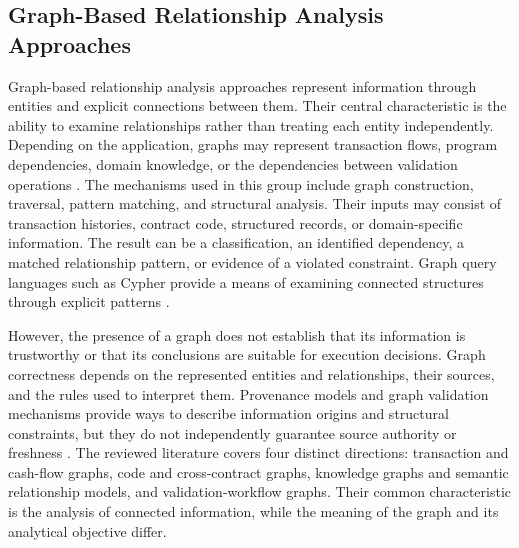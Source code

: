 



\subsection{Graph-Based Relationship Analysis Approaches}
\label{subsec:graph_structured_approaches}

Graph-based relationship analysis approaches represent
information through entities and explicit connections
between them. Their central characteristic is the
ability to examine relationships rather than treating
each entity independently. Depending on the application,
graphs may represent transaction flows, program
dependencies, domain knowledge, or the dependencies
between validation operations
\cite{hoganKnowledgeGraphs2021,
anglesPropertyGraphModel2018}. The mechanisms used in this group include graph construction,
traversal, pattern matching, and structural analysis. Their
inputs may consist of transaction histories, contract code,
structured records, or domain-specific information. The
result can be a classification, an identified dependency,
a matched relationship pattern, or evidence of a violated
constraint. Graph query languages such as Cypher provide
a means of examining connected structures through explicit
patterns \cite{francisCypher2018}.

However, the presence of a graph does not establish that
its information is trustworthy or that its conclusions
are suitable for execution decisions. Graph correctness
depends on the represented entities and relationships,
their sources, and the rules used to interpret them.
Provenance models and graph validation mechanisms provide
ways to describe information origins and structural
constraints, but they do not independently guarantee
source authority or freshness
\cite{w3cPROVO2013,w3cSHACL2017}. The reviewed literature covers four distinct directions:
transaction and cash-flow graphs, code and cross-contract
graphs, knowledge graphs and semantic relationship models,
and validation-workflow graphs. Their common characteristic
is the analysis of connected information, while the meaning
of the graph and its analytical objective differ.

